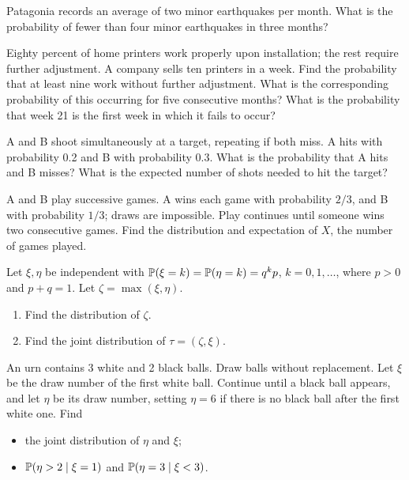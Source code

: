 \documentclass[a4paper]{report}
\begin{document}
\begin{problembook}
Patagonia records an average of two minor earthquakes per month. What is the probability of fewer than four minor earthquakes in three months?
\end{problembook}
\begin{problem}
Eighty percent of home printers work properly upon installation; the rest require further adjustment. A company sells ten printers in a week. Find the probability that at least nine work without further adjustment. What is the corresponding probability of this occurring for five consecutive months? What is the probability that week 21 is the first week in which it fails to occur?
\end{problem}
\begin{problem}
A and B shoot simultaneously at a target, repeating if both miss. A hits with probability 0.2 and B with probability 0.3. What is the probability that A hits and B misses? What is the expected number of shots needed to hit the target?
\end{problem}
\begin{problembook}[T1, CS 2024]
A and B play successive games. A wins each game with probability $2/3$, and B with probability $1/3$; draws are impossible. Play continues until someone wins two consecutive games. Find the distribution and expectation of $X$, the number of games played.
\end{problembook}
\begin{problem}
Let $\xi,\eta$ be independent with $\P(\xi=k)=\P(\eta=k)=q^kp$, $k=0,1,\dots$, where $p>0$ and $p+q=1$. Let $\zeta=\max(\xi,\eta)$.
\begin{enumerate}\item Find the distribution of $\zeta$.\item Find the joint distribution of $\tau=(\zeta,\xi)$.\end{enumerate}
\end{problem}
\begin{problembook}
An urn contains 3 white and 2 black balls. Draw balls without replacement. Let $\xi$ be the draw number of the first white ball. Continue until a black ball appears, and let $\eta$ be its draw number, setting $\eta=6$ if there is no black ball after the first white one. Find
\begin{itemize}\item the joint distribution of $\eta$ and $\xi$;\item $\P(\eta>2\mid\xi=1)$ and $\P(\eta=3\mid\xi<3)$.\end{itemize}
\end{problembook}
\end{document}
